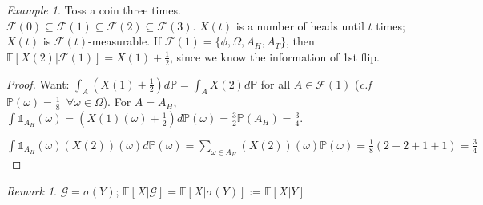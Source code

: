 \documentclass[12pt]{report}
\renewcommand{\P}{\mathbb{P}}
\newcommand{\F}{\mathcal{F}}
\newcommand{\E}{\mathbb{E}}
\renewcommand{\1}{\mathbb{1}}
\renewcommand{\subset}{\subseteq}
\theoremstyle{break}
\theoremstyle{newdef}
\theoremstyle{remark}
\newtheorem*{exmp}{Example} %
\newtheorem*{rem}{Remark} %
\begin{document}
\begin{exmp}
Toss a coin three times.\\
$\F(0) \subset \F(1) \subset \F(2) \subset \F(3)$.
$X(t)$ is a number of heads until $t$ times; $X(t)$ is $\F(t)$-measurable.
If $\F(1) = \{ \phi, \Omega, A_H, A_T\}$, then
$\E[X(2) | \F(1)] = X(1) + \frac{1}{2}$, since we know the information of 1st flip.
\begin{proof}
Want: $\int_A (X(1) + \frac{1}{2})d\P = \int_A X(2) d\P$ for all $A \in \F(1)$
(\textit{c.f} $\P(\omega) = \frac{1}{8} \enspace \forall \omega \in \Omega$).
For $A = A_H$, $\int \1_{A_H}(\omega) = (X(1)(\omega) + \frac{1}{2})d\P(\omega) = \frac{3}{2}\P(A_H) = \frac{3}{4}$.

$\int \1_{A_H}(\omega)(X(2))(\omega) d\P(\omega)
= \sum_{\omega \in A_H} (X(2))(\omega)\P(\omega) = \frac{1}{8}(2+2+1+1) = \frac{3}{4}$

\end{proof}
\end{exmp}

\begin{rem}
$\mathcal{G} = \sigma(Y)$;
$\E[X|\mathcal{G}] = \E[X | \sigma(Y)] := \E[X|Y]$
\end{rem}
\end{document}

